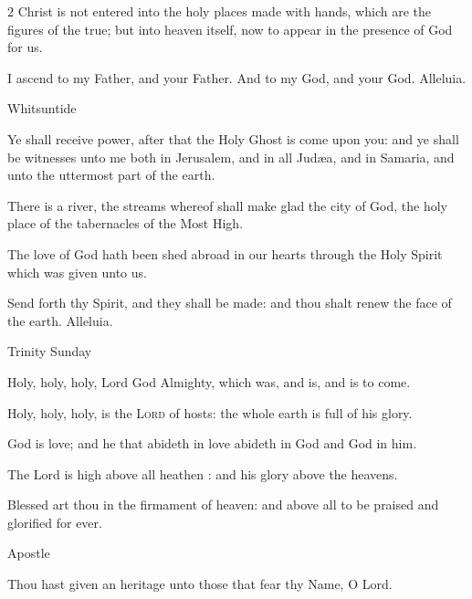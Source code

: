 \begin{multicols}{2}
    Christ is not entered into the holy places made with hands, which are the figures of the true; but into heaven itself, now to appear in the presence of God for us.

    I ascend to my Father, and your Father. And to my God, and your God. Alleluia.\\

\centerline{\color{RubricRed}\small%
Whitsuntide}
\par\noindent
    Ye shall receive power, after that the Holy Ghost is come upon you: and ye shall be witnesses unto me both in Jerusalem, and in all Jud{\ae}a, and in Samaria, and unto the uttermost part of the earth.\par
    
    There is a river, the streams whereof shall make glad the city of God, the holy place of the tabernacles of the Most High.\par

    The love of God hath been shed abroad in our hearts through the Holy Spirit which was given unto us.
    
    Send forth thy Spirit, and they shall be made: and thou shalt renew the face of the earth. Alleluia.\\

\centerline{\color{RubricRed}\small%
Trinity Sunday}
\par\noindent
    Holy, holy, holy, Lord God Almighty, which was, and is, and is to come.
    \par
    Holy, holy, holy, is the \textsc{Lord} of hosts: the whole earth is full of his glory.
    \par
    God is love; and he that abideth in love abideth in God and God in him.\par
    The Lord is high above all heathen : and his glory above the heavens.
    
    Blessed art thou in the firmament of heaven: and above all to be praised and glorified for ever.\\

\centerline{\color{RubricRed}\small%
Apostle}
\par\noindent
Thou hast given an heritage unto those that fear thy Name, O Lord.\\


\end{multicols}
